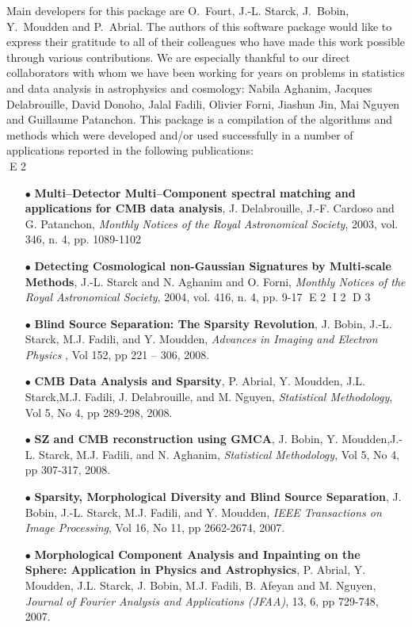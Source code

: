 Main developers for this package are  O.~Fourt, J.-L. Starck, J.~Bobin, Y.~Moudden and  P.~Abrial.
The authors of this software package would like to express their 
gratitude to all of their colleagues who have made this work  
possible through various contributions. 
We are especially thankful to our direct collaborators with whom we 
have been working for years on problems in statistics and data 
analysis in astrophysics and cosmology: Nabila Aghanim, Jacques Delabrouille, David Donoho, Jalal Fadili, 
Olivier Forni, Jiashun Jin, Mai Nguyen and Guillaume Patanchon.
This package is a compilation of the algorithms and methods which were 
developed and/or used successfully in a number of applications 
reported in the following publications: \\
E 2
\begin{itemize}
D 2
\item[$\bullet$]{ \textbf{ Multi--Detector Multi--Component spectral matching and applications for CMB data analysis}, J. Delabrouille, J.-F. Cardoso and G. Patanchon, \emph{Monthly Notices of the Royal Astronomical Society}, 2003, vol. 346, n. 4, pp. 1089-1102 }
\item[$\bullet$]{ \textbf{ Detecting Cosmological non-Gaussian Signatures by Multi-scale Methods}, J.-L. Starck and N. Aghanim and O. Forni, \emph{Monthly Notices of the Royal Astronomical Society}, 2004, vol. 416, n. 4, pp. 9-17 }
E 2
I 2
D 3
\item[$\bullet$] { \textbf{ Blind Source Separation: The Sparsity Revolution},  J. Bobin, J.-L. Starck, M.J. Fadili, and Y. Moudden,  \emph{Advances in Imaging and Electron Physics }, Vol 152, pp 221 -- 306, 2008.  }
\item[$\bullet$] {  \textbf{ CMB Data Analysis and Sparsity},  P. Abrial, Y. Moudden, J.L. Starck,M.J. Fadili, J. Delabrouille, and M. Nguyen,   \emph{Statistical Methodology}, Vol 5, No 4, pp 289-298, 2008.}
\item[$\bullet$]{   \textbf{SZ and CMB reconstruction using GMCA}, J. Bobin, Y. Moudden,J.-L. Starck, M.J. Fadili, and N. Aghanim,  \emph{Statistical Methodology}, Vol 5, No 4, pp 307-317, 2008. }
\item[$\bullet$]{   \textbf{ Sparsity, Morphological Diversity and Blind Source Separation},  J. Bobin, J.-L. Starck, M.J. Fadili, and Y. Moudden, \emph{IEEE Transactions on Image Processing}, Vol 16, No 11, pp 2662-2674, 2007. }
\item[$\bullet$] {  \textbf{Morphological Component Analysis and Inpainting on the Sphere: Application in Physics and Astrophysics},   P. Abrial, Y. Moudden, J.L. Starck, J. Bobin, M.J. Fadili, B. Afeyan and M. Nguyen,  \emph{Journal of Fourier Analysis and Applications  (JFAA)}, 13, 6, pp 729-748, 2007. }

\end{itemize}
